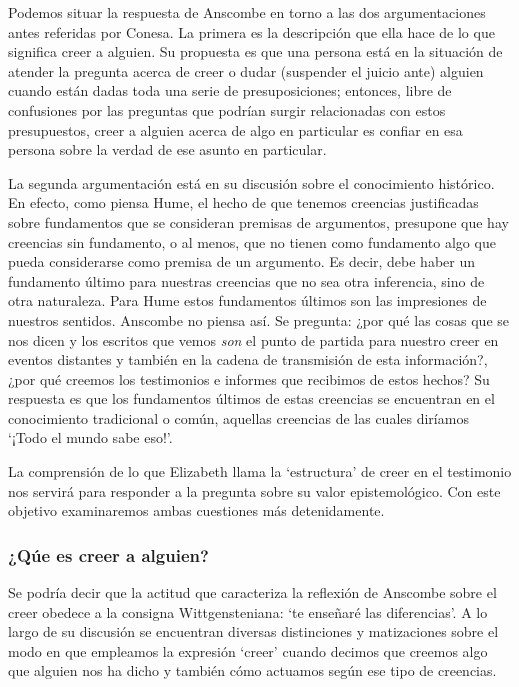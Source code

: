 Podemos situar la respuesta de Anscombe en torno a las dos argumentaciones antes referidas por Conesa. La primera es la descripción que ella hace de lo que significa creer a alguien. Su propuesta es que una persona está en la situación de atender la pregunta acerca de creer o dudar (suspender el juicio ante) alguien cuando están dadas toda una serie de presuposiciones; entonces, libre de confusiones por las preguntas que podrían surgir relacionadas con estos presupuestos, creer a alguien acerca de algo en particular es confiar en esa persona sobre la verdad de ese asunto en particular.

La segunda argumentación está en su discusión sobre el conocimiento histórico. En efecto, como piensa Hume, el hecho de que tenemos creencias justificadas sobre fundamentos que se consideran premisas de argumentos, presupone que hay creencias sin fundamento, o al menos, que no tienen como fundamento algo que pueda considerarse como premisa de un argumento. Es decir, debe haber un fundamento último para nuestras creencias que no sea otra inferencia, sino de otra naturaleza. Para Hume estos fundamentos últimos son las impresiones de nuestros sentidos. Anscombe no piensa así. Se pregunta: ¿por qué las cosas que se nos dicen y los escritos que vemos \emph{son} el punto de partida para nuestro creer en eventos distantes y también en la cadena de transmisión de esta información?, ¿por qué creemos los testimonios e informes que recibimos de estos hechos? Su respuesta es que los fundamentos últimos de estas creencias se encuentran en el conocimiento tradicional o común, aquellas creencias de las cuales diríamos \enquote*{¡Todo el mundo sabe eso!}.

La comprensión de lo que Elizabeth llama la `estructura' de creer en el testimonio nos servirá para responder a la pregunta sobre su valor epistemológico. Con este objetivo examinaremos ambas cuestiones más detenidamente.

\subsubsection{¿Qúe es creer a alguien?}

Se podría decir que la actitud que caracteriza la reflexión de Anscombe sobre el creer obedece a la consigna Wittgensteniana: \enquote*{te enseñaré las diferencias}. A lo largo de su discusión se encuentran diversas distinciones y matizaciones sobre el modo en que empleamos la expresión `creer' cuando decimos que creemos algo que alguien nos ha dicho y también cómo actuamos según ese tipo de creencias.

